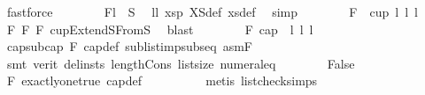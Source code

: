 \begin{isabellebody}
\ fastforce\isanewline
\ \ \ \ \ \ \isamarkupfalse%
\ F{}{\isacharcolon}{\kern0pt}{\isachardoublequoteopen}l{}\ {\isasymin}\ S{}{\isachardoublequoteclose}\ \isamarkupfalse%
\ l{}l{}\ xs{}p{}\ XS{}{\isacharunderscore}{\kern0pt}def\ xs{}{\isacharunderscore}{\kern0pt}def\ \isamarkupfalse%
\ simp\isanewline
\ \ \ \ \ \ \isamarkupfalse%
\ F{}{\isacharcolon}{\kern0pt}\ \ {\isachardoublequoteopen}cup{}\ l{}\ l{}\ l{}{\isachardoublequoteclose}\ \isamarkupfalse%
\ F{}{}\ F{}\ F{}\ cupExtendS{}FromS{}\ \isamarkupfalse%
\ blast\isanewline
\isanewline
\ \ \ \ \ \ \isamarkupfalse%
\ F{}{}{\isacharcolon}{\kern0pt}\ {\isachardoublequoteopen}cap\ {}\ {\isacharbrackleft}{\kern0pt}l{}{\isacharcomma}{\kern0pt}\ l{}{\isacharcomma}{\kern0pt}\ l{}{\isacharbrackright}{\kern0pt}{\isachardoublequoteclose}\ \isanewline
\ \ \ \ \ \ \ \ \isamarkupfalse%
\ cap{\isacharunderscore}{\kern0pt}sub{\isacharunderscore}{\kern0pt}cap\ F{}{}\ cap{\isacharunderscore}{\kern0pt}def\ sublist{\isacharunderscore}{\kern0pt}imp{\isacharunderscore}{\kern0pt}subseq\ asmF{\isacharparenleft}{\kern0pt}{}{\isacharparenright}{\kern0pt}\isanewline
\ \ \ \ \ \ \ \ \isamarkupfalse%
\ {\isacharparenleft}{\kern0pt}smt\ {\isacharparenleft}{\kern0pt}verit{\isacharcomma}{\kern0pt}\ del{\isacharunderscore}{\kern0pt}insts{\isacharparenright}{\kern0pt}\ length{\isacharunderscore}{\kern0pt}Cons\ list{\isachardot}{\kern0pt}size{\isacharparenleft}{\kern0pt}{}{\isacharparenright}{\kern0pt}\ numeral{\isacharunderscore}{\kern0pt}{}{\isacharunderscore}{\kern0pt}eq{\isacharunderscore}{\kern0pt}{}{\isacharparenright}{\kern0pt}\isanewline
\isanewline
\ \ \ \ \ \ \isamarkupfalse%
\ False\ \isamarkupfalse%
\ F{}\ exactly{\isacharunderscore}{\kern0pt}one{\isacharunderscore}{\kern0pt}true\ cap{\isacharunderscore}{\kern0pt}def\isanewline
\ \ \ \ \ \ \ \ \isamarkupfalse%
\ {\isacharparenleft}{\kern0pt}metis\ list{\isacharunderscore}{\kern0pt}check{\isachardot}{\kern0pt}simps{\isacharparenleft}{\kern0pt}{}{\isacharparenright}{\kern0pt}{\isacharparenright}{\kern0pt}\isanewline

\end{isabellebody}

